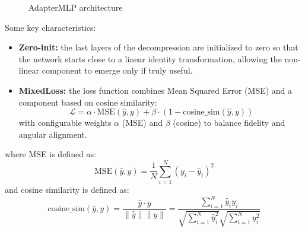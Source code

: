 \begin{figure}[t]
{%
}
    \caption{AdapterMLP architecture}
    \label{fig:alignmentnetwork-architecture-hybrid}
\end{figure}
Some key characteristics: 
\begin{itemize}
\item \textbf{Zero-init:} the last layers of the decompression are initialized to zero so that the network starts close to a linear identity transformation, allowing the non-linear component to emerge only if truly useful.
\item \textbf{MixedLoss:} the loss function combines Mean Squared Error (MSE) and a component based on cosine similarity:
\begin{equation}
\label{eq:mixed_loss}
\mathcal{L} = \alpha \cdot \mathrm{MSE}(\hat{y}, y) + \beta \cdot (1 - \text{cosine\_sim}(\hat{y}, y))
\end{equation}
with configurable weights $\alpha$ (MSE) and $\beta$ (cosine) to balance fidelity and angular alignment.
\end{itemize}

where MSE is defined as:
\begin{equation}
\label{eq:mse_def}
\mathrm{MSE}(\hat{y}, y) = \frac{1}{N} \sum_{i=1}^{N} (y_i - \hat{y}_i)^2
\end{equation}
and cosine similarity is defined as:
\begin{equation}
\label{eq:cosine_sim}
\text{cosine\_sim}(\hat{y}, y) = \frac{\hat{y} \cdot y}{\|\hat{y}\| \|y\|} = \frac{\sum_{i=1}^{N} \hat{y}_i y_i}{\sqrt{\sum_{i=1}^{N} \hat{y}_i^2} \sqrt{\sum_{i=1}^{N} y_i^2}}
\end{equation}

